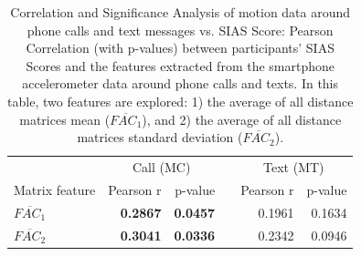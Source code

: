 \begin{table}
\caption{Correlation and Significance Analysis of motion data  around phone calls and text messages vs. SIAS Score: Pearson Correlation (with p-values) between participants' SIAS Scores and the features extracted from the smartphone accelerometer data around phone calls and texts. In this table, two features are explored: 1) the average of all distance matrices mean ($\overline{FAC_1}$), and 2) the average of all distance matrices standard deviation ($\overline{FAC_2}$).
\label{tab:pearson_matrix_call_text}}
\begin{center}
\small
\def\arraystretch{1.5}
	\begin{tabular}{ l @{\hskip 0.5in} r r r r r}
    \toprule
											& \multicolumn{2}{c}{Call (MC)} 							&	& \multicolumn{2}{c}{Text (MT)} \\
        \cline{2-3} \cline{5-6}
    	Matrix feature						& Pearson r					& p-value				&	& Pearson r				& p-value		\\
        \hline
        $\overline{FAC_1}$						& \textbf{0.2867}					& \textbf{0.0457}				&	& 0.1961					& 0.1634		\\
        $\overline{FAC_2}$						&\textbf{ 0.3041}					& \textbf{0.0336}				&	& 0.2342				& 0.0946		\\
        \bottomrule
	\end{tabular}
\end{center}
\end{table}

